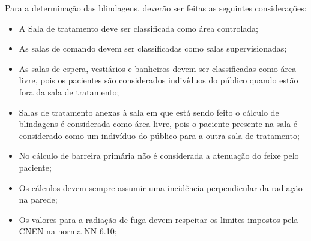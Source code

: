 \documentclass[11pt,a4paper]{article}
\begin{document}
            Para a determinação das blindagens, deverão ser feitas as seguintes considerações:

            \begin{itemize}
                \item A Sala de tratamento deve ser classificada como área controlada;
                \item As salas de comando devem ser classificadas como salas supervisionadas;
                \item As salas de espera, vestiários e banheiros devem ser classificadas como área livre, pois os pacientes são considerados indivíduos do público quando estão fora da sala de tratamento;
                \item Salas de tratamento anexas à sala em que está sendo feito o cálculo de blindagens é considerada como área livre, pois o paciente presente na sala é considerado como um indivíduo do público para a outra sala de tratamento;
                \item No cálculo de barreira primária não é considerada a atenuação do feixe pelo paciente;
                \item Os cálculos devem sempre assumir uma incidência perpendicular da radiação na parede;
                \item Os valores para a radiação de fuga devem respeitar os limites impostos pela CNEN na norma NN 6.10;
                
                \

                \begin{center}
                \end{center}
                

\end{itemize}
\end{document}
